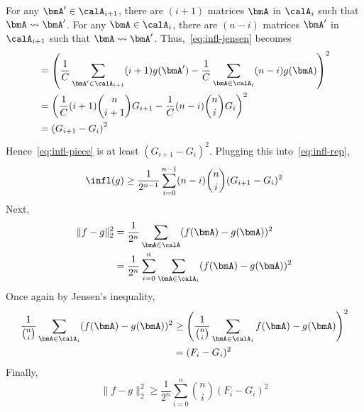 For any $\bmA' \in \calA_{i+1}$, there are $(i+1)$ matrices $\bmA$ in $\calA_i$
such that $\bmA \leadsto \bmA'$.
For any $\bmA \in \calA_i$, there are $(n-i)$ matrices $\bmA'$ in $\calA_{i+1}$
such that $\bmA \leadsto \bmA'$. Thus,~\eqref{eq:infl-jensen} becomes
\begin{align*}    
    &= \left(\frac{1}{C} \sum_{\bmA' \in \calA_{i+1}} (i+1) g(\bmA') - \frac{1}{C}\sum_{\bmA \in \calA_i} (n-i) g(\bmA) \right)^2 \\
    &= \left(\frac{1}{C} (i+1) \binom{n}{i+1} G_{i+1} - \frac{1}{C} (n-i) \binom{n}{i} G_i \right)^2 \\
    &= \left(G_{i+1} - G_i \right)^2
\end{align*}
Hence~\eqref{eq:infl-piece} is at least $(G_{i+1} - G_i)^2$. Plugging this into~\eqref{eq:infl-rep},
\begin{equation}\label{eq:infl-ineq}
    \infl(g) \geq \frac{1}{2^{n-1}} \sum_{i=0}^{n-1} (n-i)\binom{n}{i} (G_{i+1} - G_i)^2
\end{equation}
Next,
\begin{align*}
    \|f-g\|_2^2 &= \frac{1}{2^n} \sum_{\bmA \in \calA} (f(\bmA) - g(\bmA))^2 \\
    &= \frac{1}{2^n} \sum_{i=0}^n \sum_{\bmA \in \calA_i} (f(\bmA) - g(\bmA))^2
\end{align*}
Once again by Jensen's inequality,
\begin{align*}
    \frac{1}{\binom{n}{i}} \sum_{\bmA \in \calA_i} (f(\bmA) - g(\bmA))^2 &\geq \left( \frac{1}{\binom{n}{i}} \sum_{\bmA \in \calA_i} f(\bmA) - g(\bmA) \right)^2 \\
    &= (F_i - G_i)^2
\end{align*}
Finally,
\begin{equation}\label{eq:bias-ineq}
    \|f-g\|_2^2 \geq  \frac{1}{2^n} \sum_{i=0}^n \binom{n}{i} (F_i - G_i)^2
\end{equation}

